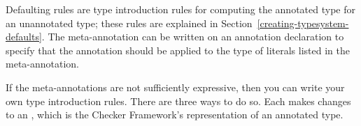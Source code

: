 Defaulting rules are type introduction rules for computing the annotated type for an unannotated type;
these rules are explained in Section~\ref{creating-typesystem-defaults}. The meta-annotation  can be written on an annotation
declaration to specify that the annotation should be applied to the type of literals listed in the
meta-annotation.


If the meta-annotations are not sufficiently expressive, then you
can write your own type introduction rules.  There are three ways to do so.
Each makes changes to an ,
which is the Checker Framework's representation of an annotated type.



